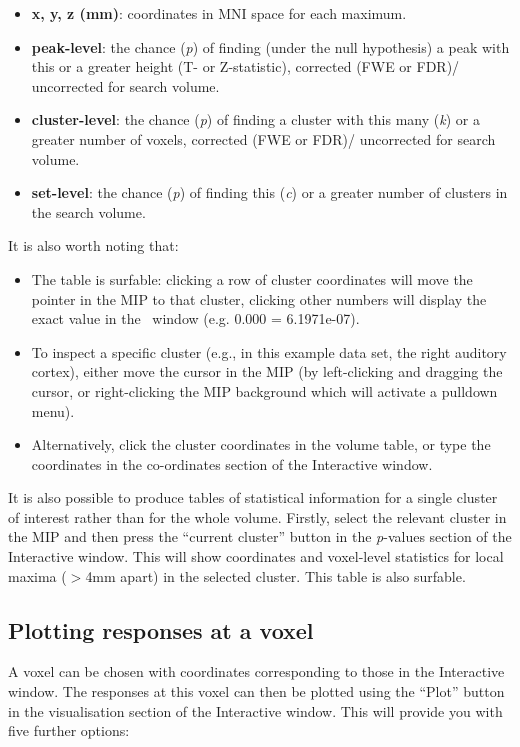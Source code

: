 \begin{itemize}
\item \textbf{x, y, z (mm)}: coordinates in MNI space for each maximum.
\item \textbf{peak-level}: the chance (\textit{p}) of finding (under the null hypothesis) a peak with this or a greater height (T- or Z-statistic), corrected (FWE or FDR)/ uncorrected for search volume.
\item \textbf{cluster-level}: the chance (\textit{p}) of finding a cluster with this many (\textit{k}) or a greater number of voxels, corrected (FWE or FDR)/ uncorrected for search volume.
\item \textbf{set-level}: the chance (\textit{p}) of finding this (\textit{c}) or a greater number of clusters in the search volume.
\end{itemize}

It is also worth noting that:

\begin{itemize}
\item The table is surfable: clicking a row of cluster coordinates will move the pointer in the MIP to that cluster, clicking other numbers will display the exact value in the \matlab\ window (e.g. 0.000 = 6.1971e-07).
\item To inspect a specific cluster (e.g., in this example data set, the right auditory cortex), either move the cursor in the MIP (by left-clicking and dragging the cursor, or right-clicking the MIP background which will activate a pulldown menu).
\item Alternatively, click the cluster coordinates in the volume table, or type the coordinates in the co-ordinates section of the Interactive window.
\end{itemize}

It is also possible to produce tables of statistical information for a single cluster of interest rather than for the whole volume. Firstly, select the relevant cluster in the MIP and then press the ``current cluster'' button in the \textit{p}-values section of the Interactive window. This will show coordinates and voxel-level statistics for local maxima ($>$4mm apart) in the selected cluster. This table is also surfable.

\subsection{Plotting responses at a voxel}

A voxel can be chosen with coordinates corresponding to those in the Interactive window. The responses at this voxel can then be plotted using the ``Plot'' button in the visualisation section of the Interactive window. This will provide you with five further options:

